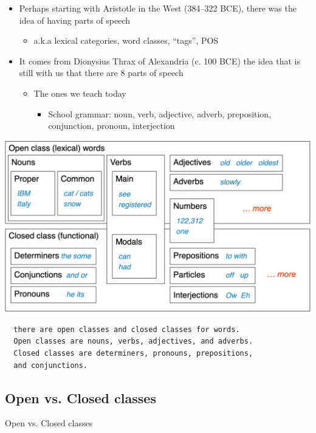 \documentclass[11pt]{article}
\theoremstyle{definition}
\begin{document}
\begin{itemize}
  \item Perhaps starting with Aristotle in the West (384–322 BCE), there
  was the idea of having parts of speech
  \begin{itemize}
    \item a.k.a lexical categories, word classes, “tags”, POS
  \end{itemize}
  \item It comes from Dionysius Thrax of Alexandria (c. 100 BCE) the
  idea that is still with us that there are 8 parts of speech
  \begin{itemize}
    \item The ones we teach today
    \begin{itemize}
      \item School grammar: noun, verb, adjective, adverb, preposition,
      conjunction, pronoun, interjection
    \end{itemize}
  \end{itemize}
\end{itemize}

\includegraphics[width=\textwidth]{1.png}

\begin{verbatim}
  there are open classes and closed classes for words. 
  Open classes are nouns, verbs, adjectives, and adverbs.
  Closed classes are determiners, pronouns, prepositions, 
  and conjunctions.
\end{verbatim}

\subsection{Open vs. Closed classes}
Open vs. Closed classes
\end{document}
